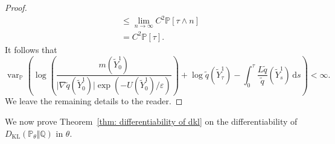 \documentclass[reqno]{amsart}
\newcommand{\eps}{\varepsilon}
\newcommand{\1}{\mathds{1}}
\renewcommand{\d}{\mathrm{d}}
\newcommand{\grad}{\nabla}
\renewcommand{\P}{\mathds{P}}
\newcommand{\Q}{\mathds{Q}}
\DeclareMathOperator{\var}{var}
\newcommand{\dkl}{D_{\mathrm{KL}}}
\theoremstyle{definition}
\theoremstyle{remark}
\begin{document}
\begin{proof}
\begin{align*}
                 &\leq \lim_{n \rightarrow \infty} C^2 \P[\tau \wedge n] \\
                 &= C^2 \P[\tau]. 
  \end{align*}
  It follows that
  \begin{equation*}
      \var_\P \left (  \log \left ( \frac{ m(\tilde Y^1_0)}{\lvert \grad  \tilde q (\tilde Y^1_0) \rvert \exp(-U(\tilde Y^1_0)/\eps)} \right ) + \log \tilde q(\tilde Y^1_\tau) -  \int_0^\tau \frac{L \tilde q}{\tilde q}(\tilde Y^1_s) \, \d s \right ) < \infty.
    \end{equation*}
    We leave the remaining details to the reader. 
\end{proof}

We now prove Theorem~\ref{thm: differentiability of dkl} on the differentiability of $\dkl ( \P_\theta \Vert \Q)$ in $\theta$.
\end{document}
